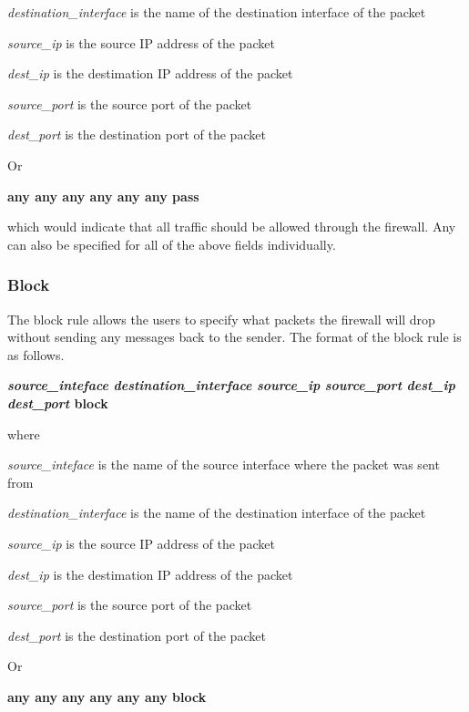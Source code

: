 \documentclass[12pt]{article} %
\begin{document}
\emph{destination\_interface} is the name of the destination interface of the packet 

\emph{source\_ip} is the source IP address of the packet 

\emph{dest\_ip} is the destimation IP address of the packet

\emph{source\_port} is the source port of the packet

\emph{dest\_port} is the destination port of the packet 

\vspace{2pc}
Or

\vspace{2pc}
\textbf{any any any any any any pass}
\vspace{2pc}

which would indicate that all traffic should be allowed through the firewall. Any can also be specified for all of the above fields individually.

\subsubsection{Block} %
The block rule allows the users to specify what packets the firewall will drop without sending any messages back to the sender.
The format of the block rule is as follows. 

\vspace{1pc}
\textbf{\emph{source\_inteface} \emph{destination\_interface} \emph{source\_ip} \emph{source\_port} \emph{dest\_ip} \emph{dest\_port} block}
\vspace{1pc}

where

\emph{source\_inteface} is the name of the source interface where the packet was sent from

\emph{destination\_interface} is the name of the destination interface of the packet 

\emph{source\_ip} is the source IP address of the packet 

\emph{dest\_ip} is the destimation IP address of the packet

\emph{source\_port} is the source port of the packet

\emph{dest\_port} is the destination port of the packet 

\vspace{2pc}
Or

\vspace{2pc}
\textbf{any any any any any any block}
\vspace{2pc}
\end{document}
